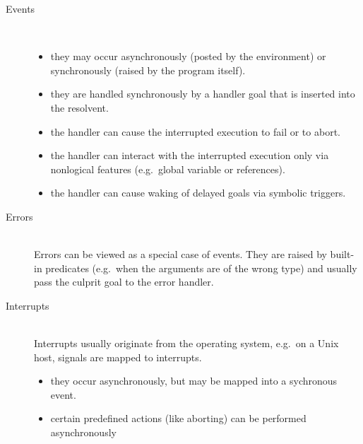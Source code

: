 \begin{description}
\item[Events]\ \\
    \begin{itemize}
    \item they may occur asynchronously (posted by the environment)
        or synchronously (raised by the program itself).
    \item they are handled synchronously by a handler goal that is inserted
        into the resolvent.
    \item the handler can cause the interrupted execution to fail or to abort.
    \item the handler can interact with the interrupted execution only via
        nonlogical features (e.g.\ global variable or references).
    \item the handler can cause waking of delayed goals via symbolic triggers.
    \end{itemize}

\item[Errors]\ \\
    Errors can be viewed as a special case of events. They are raised by
    built-in predicates (e.g.\ when the arguments are of the wrong type)
    and usually pass the culprit goal to the error handler.

\item[Interrupts]\ \\
    Interrupts usually originate from the operating system, e.g.\ on a Unix
    host, signals are mapped to {\eclipse} interrupts.
    \begin{itemize}
    \item they occur asynchronously, but may be mapped into a sychronous event.
    \item certain predefined actions (like aborting) can be performed
        asynchronously
    \end{itemize}
\end{description}


